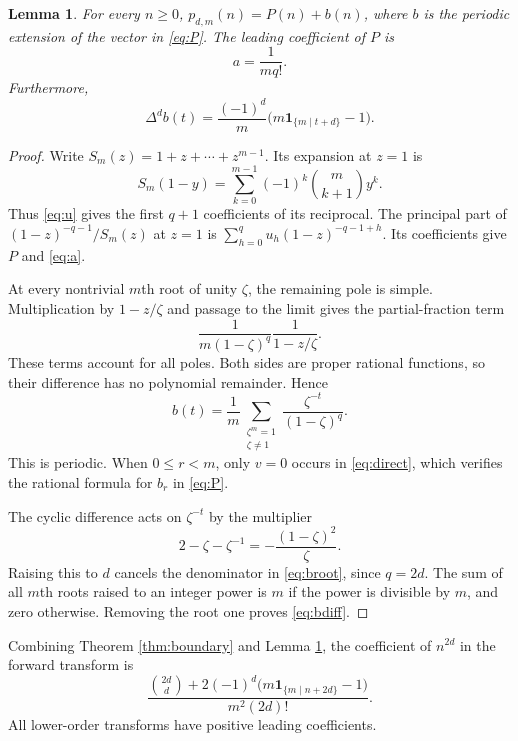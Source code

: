 \documentclass[11pt,reqno]{amsart}
\newtheorem{lemma}[theorem]{Lemma}
\theoremstyle{remark}
\newcommand{\Dlt}{\Delta}
\newcommand{\ind}{\mathbf{1}}
\begin{document}
\begin{lemma}\label{lem:partition}
For every \(n\ge0\), \(p_{d,m}(n)=P(n)+b(n)\), where \(b\) is the periodic
extension of the vector in \eqref{eq:P}. The leading coefficient of \(P\) is
\begin{equation}\label{eq:a}
 a=\frac1{mq!}.
\end{equation}
Furthermore,
\begin{equation}\label{eq:bdiff}
 \Dlt^db(t)=\frac{(-1)^d}{m}
       \bigl(m\ind_{\{m\mid t+d\}}-1\bigr).
\end{equation}
\end{lemma}
\begin{proof}
Write \(S_m(z)=1+z+\cdots+z^{m-1}\). Its expansion at \(z=1\) is
\[
 S_m(1-y)=\sum_{k=0}^{m-1}(-1)^k\binom{m}{k+1}y^k.
\]
Thus \eqref{eq:u} gives the first \(q+1\) coefficients of its reciprocal.
The principal part of
\((1-z)^{-q-1}/S_m(z)\) at \(z=1\) is
\(\sum_{h=0}^qu_h(1-z)^{-q-1+h}\). Its coefficients give \(P\) and
\eqref{eq:a}.

At every nontrivial \(m\)th root of unity \(\zeta\), the remaining pole is
simple. Multiplication by \(1-z/\zeta\) and passage to the limit gives the
partial-fraction term
\[
 \frac{1}{m(1-\zeta)^q}\frac{1}{1-z/\zeta}.
\]
These terms account for all poles. Both sides are proper rational functions,
so their difference has no polynomial remainder. Hence
\begin{equation}\label{eq:broot}
 b(t)=\frac1m\sum_{\substack{\zeta^m=1\\\zeta\ne1}}
                 \frac{\zeta^{-t}}{(1-\zeta)^q}.
\end{equation}
This is periodic. When \(0\le r<m\), only \(v=0\) occurs in \eqref{eq:direct},
which verifies the rational formula for \(b_r\) in \eqref{eq:P}.

The cyclic difference acts on \(\zeta^{-t}\) by the multiplier
\[
 2-\zeta-\zeta^{-1}=-\frac{(1-\zeta)^2}{\zeta}.
\]
Raising this to \(d\) cancels the denominator in \eqref{eq:broot}, since
\(q=2d\). The sum of all \(m\)th roots raised to an integer power is \(m\)
if the power is divisible by \(m\), and zero otherwise. Removing the root
one proves \eqref{eq:bdiff}.
\end{proof}

Combining Theorem \ref{thm:boundary} and Lemma \ref{lem:partition}, the
coefficient of \(n^{2d}\) in the forward transform is
\begin{equation}\label{eq:familygamma}
 \frac{\binom{2d}{d}
       +2(-1)^d\bigl(m\ind_{\{m\mid n+2d\}}-1\bigr)}
      {m^2(2d)!}.
\end{equation}
All lower-order transforms have positive leading coefficients.
\end{document}

